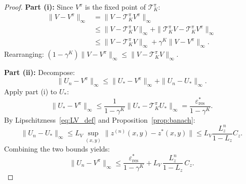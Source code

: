 \documentclass{article}
\theoremstyle{plain}
\theoremstyle{definition}
\theoremstyle{remark}
\newcommand{\longonly}[1]{}
\newcommand{\longonly}[1]{#1}
\begin{document}
\begin{proof}
\textbf{Part (i):}
Since $V^\pi$ is the fixed point of $\mathcal{T}^\pi_K$\longonly{ (Lemma~\ref{lem:Kstep_contraction})}:
\begin{align*}
\|V - V^\pi\|_\infty &= \|V - \mathcal{T}^\pi_K V^\pi\|_\infty \\
&\le \|V - \mathcal{T}^\pi_K V\|_\infty + \|\mathcal{T}^\pi_K V - \mathcal{T}^\pi_K V^\pi\|_\infty \\
&\le \|V - \mathcal{T}^\pi_K V\|_\infty + \gamma^K\|V - V^\pi\|_\infty.
\end{align*}
Rearranging: $(1-\gamma^K)\|V-V^\pi\|_\infty \le \|V - \mathcal{T}^\pi_K V\|_\infty$.

\textbf{Part (ii):}
Decompose:
\[
\|U_n - V^\pi\|_\infty \le \|U_* - V^\pi\|_\infty + \|U_n - U_*\|_\infty.
\]
Apply part (i) to $U_*$:
\[
\|U_* - V^\pi\|_\infty \le \frac{1}{1-\gamma^K}\|U_* - \mathcal{T}^\pi_K U_*\|_\infty = \frac{\varepsilon_{\mathrm{res}}^*}{1-\gamma^K}.
\]
By Lipschitzness~\eqref{eq:LV_def} and Proposition~\ref{prop:banach}:
\[
\|U_n - U_*\|_\infty \le L_V \sup_{(x,y)}\|z^{(n)}(x,y) - z^*(x,y)\| \le L_V \frac{L_z^n}{1-L_z} C_z.
\]
Combining the two bounds yields:
\[
\|U_n - V^\pi\|_\infty
\le
\frac{\varepsilon_{\mathrm{res}}^*}{1-\gamma^K}
+
L_V\,\frac{L_z^n}{1-L_z}\,C_z.
\]
\end{proof}

\longonly{
\subsection{Proof of Lemma~\ref{lem:residual_transfer}}
Throughout this proof, interpret $\|\cdot\|_\infty$ as the sup-norm over the advantage-evaluation closure $\mathcal{R}_{\pi,\pi_{\mathrm{cand}}}^{\mathrm{adv}}$ (Definition~\ref{def:adv_closure}), which is closed under forward dynamics of $\pi$ and contains $s_{\mathrm{abs}}$.

\begin{proof}
For any $s$:
\begin{align*}
U_*(s) - \mathcal{T}^\pi_K U_*(s) &= (U_* - U_n)(s) + (U_n - \mathcal{T}^\pi_K U_n)(s) \\
&\quad + (\mathcal{T}^\pi_K U_n - \mathcal{T}^\pi_K U_*)(s).
\end{align*}
Taking absolute values and sup-norms:
\begin{align*}
\|U_* - \mathcal{T}^\pi_K U_*\|_\infty &\le \|U_n - U_*\|_\infty + \|U_n - \mathcal{T}^\pi_K U_n\|_\infty \\
&\quad + \gamma^K\|U_n - U_*\|_\infty \\
&= \|U_n - \mathcal{T}^\pi_K U_n\|_\infty + (1+\gamma^K)\|U_n - U_*\|_\infty.
\end{align*}
\end{proof}
}
\end{document}
